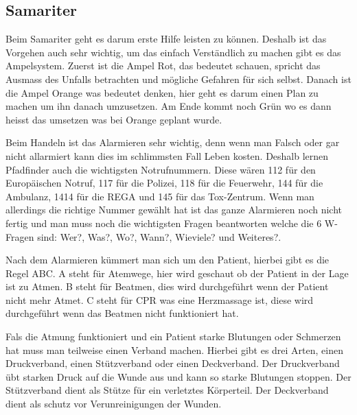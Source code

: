\subsection*{Samariter}
Beim Samariter geht es darum erste Hilfe leisten zu können. Deshalb ist das Vorgehen auch sehr wichtig, um das einfach Verständlich zu machen gibt es das Ampelsystem. Zuerst ist die Ampel Rot, das bedeutet schauen, spricht das Ausmass des Unfalls betrachten und mögliche Gefahren für sich selbst. Danach ist die Ampel Orange was bedeutet denken, hier geht es darum einen Plan zu machen um ihn danach umzusetzen. Am Ende kommt noch Grün wo es dann heisst das umsetzen was bei Orange geplant wurde. \par
Beim Handeln ist das Alarmieren sehr wichtig, denn wenn man Falsch oder gar nicht allarmiert kann dies im schlimmsten Fall Leben kosten. Deshalb lernen Pfadfinder auch die wichtigsten Notrufnummern. Diese wären 112 für den Europäischen Notruf, 117 für die Polizei, 118 für die Feuerwehr, 144 für die Ambulanz, 1414 für die REGA und 145 für das Tox-Zentrum. Wenn man allerdings die richtige Nummer gewählt hat ist das ganze Alarmieren noch nicht fertig und man muss noch die wichtigsten Fragen beantworten welche die 6 W-Fragen sind: Wer?, Was?, Wo?, Wann?, Wieviele? und Weiteres?. \par
Nach dem Alarmieren kümmert man sich um den Patient, hierbei gibt es die Regel ABC. A steht für Atemwege, hier wird geschaut ob der Patient in der Lage ist zu Atmen. B steht für Beatmen, dies wird durchgeführt wenn der Patient nicht mehr Atmet. C steht für CPR was eine Herzmassage ist, diese wird durchgeführt wenn das Beatmen nicht funktioniert hat. \par
Fals die Atmung funktioniert und ein Patient starke Blutungen oder Schmerzen hat muss man teilweise einen Verband machen. Hierbei gibt es drei Arten, einen Druckverband, einen Stützverband oder einen Deckverband. Der Druckverband übt starken Druck auf die Wunde aus und kann so starke Blutungen stoppen. Der Stützverband dient als Stütze für ein verletztes Körperteil. Der Deckverband dient als schutz vor Verunreinigungen der Wunden.

